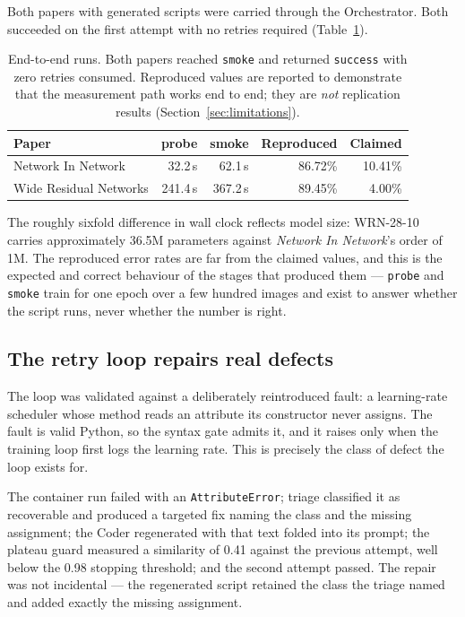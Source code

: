 \documentclass[10pt,twocolumn]{article}
\begin{document}
Both papers with generated scripts were carried through the Orchestrator. Both succeeded
on the first attempt with no retries required (Table~\ref{tab:runs}).

\begin{table}[htbp]
\centering
\small
\caption{End-to-end runs. Both papers reached \texttt{smoke} and returned
\texttt{success} with zero retries consumed. Reproduced values are reported to
demonstrate that the measurement path works end to end; they are \emph{not}
replication results (Section~\ref{sec:limitations}).}
\label{tab:runs}
\begin{tabular}{lrrrr}
\toprule
Paper & probe & smoke & Reproduced & Claimed \\
\midrule
Network In Network     &  32.2\,s &  62.1\,s & 86.72\% & 10.41\% \\
Wide Residual Networks & 241.4\,s & 367.2\,s & 89.45\% &  4.00\% \\
\bottomrule
\end{tabular}
\end{table}

The roughly sixfold difference in wall clock reflects model size: WRN-28-10 carries
approximately 36.5M parameters against \emph{Network In Network}'s order of 1M. The
reproduced error rates are far from the claimed values, and this is the expected and
correct behaviour of the stages that produced them --- \texttt{probe} and \texttt{smoke}
train for one epoch over a few hundred images and exist to answer whether the script
runs, never whether the number is right.

\subsection{The retry loop repairs real defects}

The loop was validated against a deliberately reintroduced fault: a learning-rate
scheduler whose method reads an attribute its constructor never assigns. The fault is
valid Python, so the syntax gate admits it, and it raises only when the training loop
first logs the learning rate. This is precisely the class of defect the loop exists for.

The container run failed with an \texttt{AttributeError}; triage classified it as
recoverable and produced a targeted fix naming the class and the missing assignment; the
Coder regenerated with that text folded into its prompt; the plateau guard measured a
similarity of 0.41 against the previous attempt, well below the 0.98 stopping threshold;
and the second attempt passed. The repair was not incidental --- the regenerated script
retained the class the triage named and added exactly the missing assignment.
\end{document}
